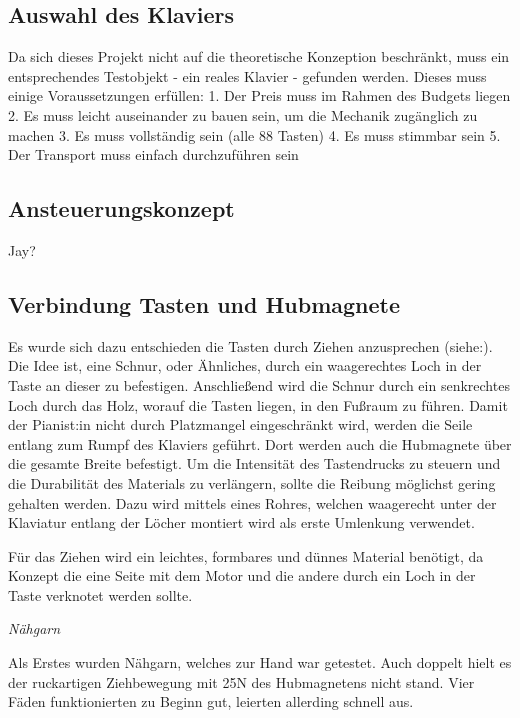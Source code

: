 \subsection{Auswahl des Klaviers}

Da sich dieses Projekt nicht auf die theoretische Konzeption beschränkt, muss ein entsprechendes Testobjekt - ein reales Klavier - gefunden werden.
Dieses muss einige Voraussetzungen erfüllen:
	1. Der Preis muss im Rahmen des Budgets liegen
	2. Es muss leicht auseinander zu bauen sein, um die Mechanik zugänglich zu machen
	3. Es muss vollständig sein (alle 88 Tasten)
	4. Es muss stimmbar sein
	5. Der Transport muss einfach durchzuführen sein


\subsection{Ansteuerungskonzept}

Jay?


\subsection{Verbindung Tasten und Hubmagnete}

Es wurde sich dazu entschieden die Tasten durch Ziehen anzusprechen (siehe:).
Die Idee ist, eine Schnur, oder Ähnliches, durch ein waagerechtes Loch in der Taste an dieser zu befestigen.
Anschließend wird die Schnur durch ein senkrechtes Loch durch das Holz, worauf die Tasten liegen, in den Fußraum zu führen.
Damit der Pianist:in nicht durch Platzmangel eingeschränkt wird, werden die Seile entlang zum Rumpf des Klaviers geführt.
Dort werden auch die Hubmagnete über die gesamte Breite befestigt.
Um die Intensität des Tastendrucks zu steuern und die Durabilität des Materials zu verlängern, sollte die Reibung möglichst gering gehalten werden.
Dazu wird mittels eines Rohres, welchen waagerecht unter der Klaviatur entlang der Löcher montiert wird als erste Umlenkung verwendet.


Für das Ziehen wird ein leichtes, formbares und dünnes Material benötigt, da Konzept die eine Seite mit dem Motor und die andere durch ein Loch in der Taste verknotet werden sollte.

\textit{Nähgarn}

Als Erstes wurden Nähgarn, welches zur Hand war getestet.
Auch doppelt hielt es der ruckartigen Ziehbewegung mit 25N des Hubmagnetens nicht stand.
Vier Fäden funktionierten zu Beginn gut, leierten allerding schnell aus.

